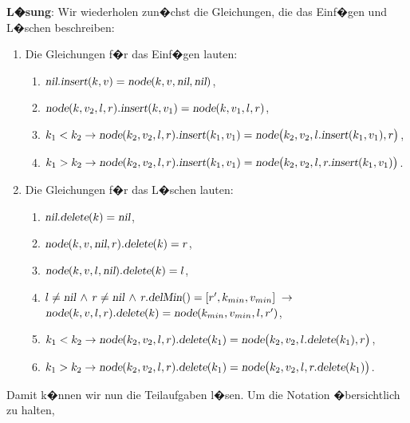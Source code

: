 \documentclass{article}
\renewcommand{\labelenumi}{(\alph{enumi})}
\begin{document}
\noindent
\textbf{L�sung}:
Wir wiederholen zun�chst die Gleichungen, die das Einf�gen und L�schen beschreiben:
\begin{enumerate}
\renewcommand{\labelenumi}{\arabic{enumi}.}
\item Die Gleichungen f�r das Einf�gen lauten:
  \begin{enumerate}
  \item $\textsl{nil}\mathtt{.}\textsl{insert}(k,v) = \textsl{node}(k,v, \textsl{nil}, \textsl{nil})$,
  \item $\textsl{node}(k, v_2, l, r)\mathtt{.}\textsl{insert}(k,v_1) = \textsl{node}(k, v_1, l, r)$,
  \item $k_1 < k_2 \rightarrow 
          \textsl{node}(k_2, v_2, l, r)\mathtt{.}\textsl{insert}(k_1, v_1) =
          \textsl{node}\bigl(k_2, v_2, l\mathtt{.}\textsl{insert}(k_1, v_1), r\bigr)$,
  \item $k_1 > k_2 \rightarrow 
         \textsl{node}(k_2, v_2, l, r)\mathtt{.}\textsl{insert}(k_1, v_1) = 
         \textsl{node}\bigl(k_2, v_2, l, r\mathtt{.}\textsl{insert}(k_1, v_1)\bigr)$.
\end{enumerate}
\item Die Gleichungen f�r das L�schen lauten:
  \begin{enumerate}
  \item $\textsl{nil}\mathtt{.}\textsl{delete}(k) = \textsl{nil}$,
  \item $\textsl{node}(k,v,\textsl{nil},r)\mathtt{.}\textsl{delete}(k) = r$,
  \item $\textsl{node}(k,v,l,\textsl{nil})\mathtt{.}\textsl{delete}(k) = l$,
  \item $l \not= \textsl{nil} \,\wedge\, r \not= \textsl{nil} \,\wedge\, r\mathtt{.}\textsl{delMin}() = [r',k_{min}, v_{min}]  \;\rightarrow$ \\[0.1cm]
      \hspace*{1.3cm}
      $\textsl{node}(k,v,l,r)\mathtt{.}\textsl{delete}(k) = \textsl{node}(k_{min},v_{min},l,r')$,
  \item $k_1 < k_2 \rightarrow \textsl{node}(k_2,v_2,l,r)\mathtt{.}\textsl{delete}(k_1) = 
       \textsl{node}\bigl(k_2,v_2,l\mathtt{.}\textsl{delete}(k_1),r\bigr)$,
  \item $k_1 > k_2 \rightarrow \textsl{node}(k_2,v_2,l,r)\mathtt{.}\textsl{delete}(k_1) = 
       \textsl{node}\bigl(k_2,v_2,l,r\mathtt{.}\textsl{delete}(k_1)\bigr)$.
\end{enumerate}
\end{enumerate}
Damit k�nnen wir nun die Teilaufgaben l�sen.  Um die Notation �bersichtlich zu halten,
\end{document}
